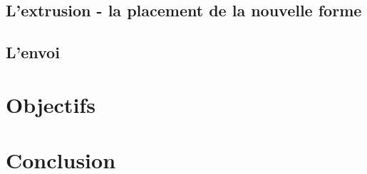 \documentclass[a4paper,11pt]{article}
\begin{document}
		\subsection{L'extrusion - la placement de la nouvelle forme}
		\subsection{L'envoi}
	\section{Objectifs}
	\section{Conclusion}
	
\end{document}
